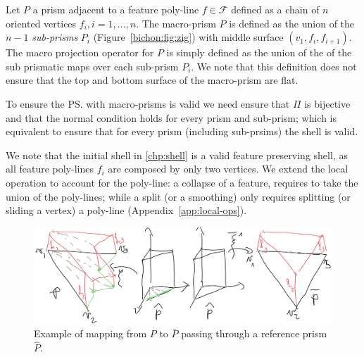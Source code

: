 Let $P$ a prism adjacent to a feature poly-line $f\in\mathcal{F}$ defined as a chain of $n$ oriented vertices $f_i, i=1,\dots,n$. The macro-prism $P$ is defined as the union of the $n-1$ \emph{sub-prisms} $P_i$ (Figure~\ref{bichon:fig:zig}) with middle surface $(v_1, f_i, f_{i+1})$. The macro projection operator for $P$ is simply defined as the union of the of the sub prismatic maps over each sub-prism $P_i$. We note that this definition does not ensure that the top and bottom surface of the macro-prism are flat.


To ensure the \ps{} with macro-prisms is valid we need ensure that $\Pi$ is bijective and that the normal condition holds for every prism and sub-prism; which is equivalent to ensure that for every prism (including sub-prsims) the shell is valid.

We note that the initial shell in \ref{chp:shell} is a valid feature preserving shell, as all feature poly-lines $f_i$ are composed by only two vertices. We extend the local operation to account for the poly-line: a collapse of a feature, requires to take the union of the poly-lines; while a split (or a smoothing) only requires splitting (or sliding a vertex) a poly-line (Appendix~\ref{app:local-ops}).


\begin{figure}
    \centering
    \includegraphics[width=\linewidth]{curve_meshing_in_shell_tex/figs/mappings}
    \caption{Example of mapping from $P$ to $\bar P$ passing through a reference prism $\hat P$.}
    \label{bichon:fig:ref-mapping}
\end{figure}


